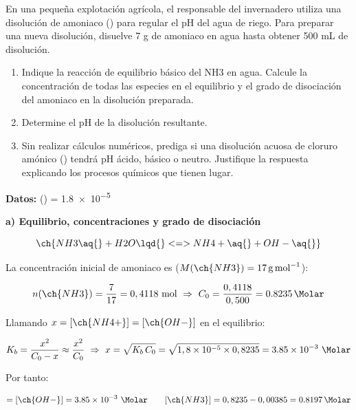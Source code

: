 \begin{exerciseEVAU}
En una pequeña explotación agrícola, el responsable del invernadero utiliza una disolución de amoniaco
() para regular el pH del agua de riego. Para preparar una nueva disolución, disuelve 7 g de amoniaco
en agua hasta obtener 500 mL de disolución.
\begin{enumerate}[label=\letraminuscula]
    \item Indique la reacción de equilibrio básico del NH3 en agua. Calcule la concentración de todas
las especies en el equilibrio y el grado de disociación del amoniaco en la disolución preparada.
    \item Determine el pH de la disolución resultante.
    \item Sin realizar cálculos numéricos, prediga si una disolución acuosa de cloruro amónico ()
tendrá pH ácido, básico o neutro. Justifique la respuesta explicando los procesos químicos que tienen
lugar.
\end{enumerate}
\textbf{Datos:} \Kb () = \num{1.8e-5}
\begin{solu}

    \textbf{a) Equilibrio, concentraciones y grado de disociación}

    \begin{equation*}
        \ch{NH3 \aq{} + H2O \lqd{} <=> NH4+ \aq{} + OH- \aq{}}
    \end{equation*}

    La concentración inicial de amoniaco es (\(M(\ch{NH3}) = \SI{17}{\gram\per\mole}\)):

    \begin{equation*}
        n(\ch{NH3}) = \dfrac{7}{17} = 0,4118 \ \text{mol} \ \Rightarrow \ C_0 = \dfrac{0,4118}{0,500} = \SI{0.8235}{\Molar}
    \end{equation*}

    Llamando \(x = [\ch{NH4+}] = [\ch{OH-}]\) en el equilibrio:

    \begin{equation*}
        K_b = \dfrac{x^2}{C_0 - x} \approx \dfrac{x^2}{C_0} \ \Rightarrow \ x = \sqrt{K_b\, C_0} = \sqrt{1,8 \times 10^{-5} \times 0,8235} = \num{3.85e-3} \ \si{\Molar}
    \end{equation*}

    Por tanto:

    \begin{equation*}
        [\ch{NH4+}] = [\ch{OH-}] = \num{3.85e-3} \ \si{\Molar} \qquad [\ch{NH3}] = 0,8235 - 0,00385 = \SI{0.8197}{\Molar}
    \end{equation*}


\end{solu}
\end{exerciseEVAU}
